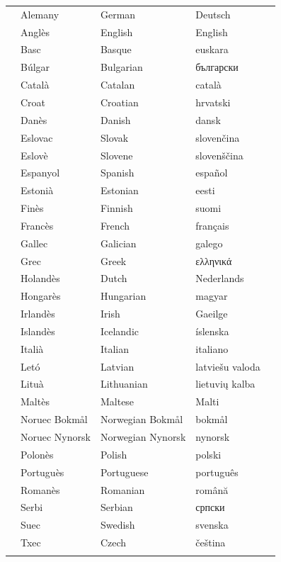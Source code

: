 \vspace*{-5mm}
\centering
  \setlength{\tabcolsep}{2.3em}
  \begin{tabularx}{\textwidth}{lllll} \toprule\addlinespace
 &Alemany & German & Deutsch\\
 &Anglès & English & English\\
  &Basc & Basque & euskara\\
  &Búlgar & Bulgarian & български \\
  &Català & Catalan & català\\
  &Croat & Croatian & hrvatski\\
  &Danès & Danish & dansk\\
  &Eslovac & Slovak & slovenčina\\
  &Eslovè & Slovene & slovenščina\\
  &Espanyol & Spanish & español\\
  &Estonià & Estonian & eesti\\
  &Finès & Finnish & suomi\\
  &Francès & French & français\\
  &Gallec & Galician & galego\\
  &Grec & Greek & ελληνικά\\
  &Holandès & Dutch & Nederlands\\
  &Hongarès & Hungarian & magyar\\ 
  &Irlandès & Irish & Gaeilge\\
  &Islandès & Icelandic & íslenska\\
  &Italià & Italian & italiano\\
  &Letó & Latvian & latviešu valoda\\
  &Lituà & Lithuanian & lietuvių kalba\\
  &Maltès & Maltese & Malti\\
  &Noruec Bokmål & Norwegian Bokmål & bokmål\\
  &Noruec Nynorsk & Norwegian Nynorsk & nynorsk\\
  &Polonès & Polish & polski\\
  &Portuguès & Portuguese & português\\
  &Romanès & Romanian & română\\
  &Serbi & Serbian & српски\\
  &Suec & Swedish & svenska\\
  &Txec & Czech & čeština\\  \addlinespace \bottomrule
\end{tabularx}
